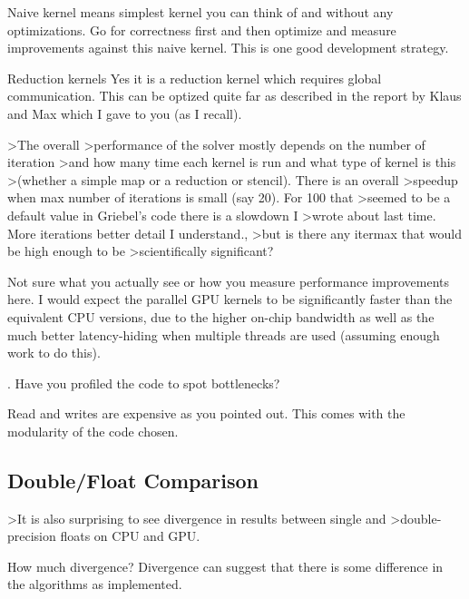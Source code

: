 Naive kernel means simplest kernel you can think of and without any
optimizations. Go for correctness first and then optimize and measure
improvements against this naive kernel. This is one good development
strategy.


Reduction kernels
Yes it is a reduction kernel which requires global communication. This can
be optized quite far as described in the report by Klaus and Max which I
gave to you (as I recall).


>The overall
>performance of the solver mostly depends on the number of iteration
>and how many time each kernel is run and what type of kernel is this
>(whether a simple map or a reduction or stencil). There is an overall
>speedup when max number of iterations is small (say 20). For 100 that
>seemed to be a default value in Griebel's code there is a slowdown I
>wrote about last time. More iterations better detail I understand.,
>but is there any itermax that would be high enough to be
>scientifically significant?

Not sure what you actually see or how you measure performance improvements
here. I would expect the parallel GPU kernels to be significantly faster
than the equivalent CPU versions, due to the higher on-chip bandwidth as
well as the much better latency-hiding when multiple threads are used
(assuming enough work to do this).


. Have you profiled the code to spot bottlenecks?

Read and writes are expensive as you pointed out. This comes with the
modularity of the code chosen.

\subsection{Double/Float Comparison}

>It is also surprising to see divergence in results between single and
>double-precision floats on CPU and GPU.

How much divergence? Divergence can suggest that there is some difference
in the algorithms as implemented.